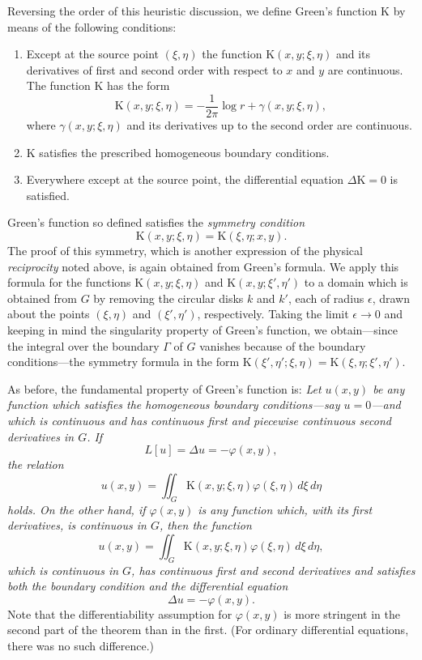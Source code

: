 Reversing the order of this heuristic discussion, we define Green's function $\mathrm K$ by means of the following conditions:
\begin{enumerate}[label=(\arabic*)]
\item Except at the source point $(\xi,\eta)$ the function $\mathrm K(x,y;\xi,\eta)$ and its derivatives of first and second order with respect to $x$ and $y$ are continuous. The function $\mathrm K$ has the form
\[
\mathrm K(x,y;\xi,\eta)=-\frac1{2\pi}\log r+\gamma(x,y;\xi,\eta),
\]
where $\gamma(x,y;\xi,\eta)$ and its derivatives up to the second order are continuous.
\item $\mathrm K$ satisfies the prescribed homogeneous boundary conditions.
\item Everywhere except at the source point, the differential equation $\Delta\mathrm K=0$ is satisfied.
\end{enumerate}
Green's function so defined satisfies the \emph{symmetry condition}
\[
\mathrm K(x,y;\xi,\eta)=\mathrm K(\xi,\eta;x,y).
\]
The proof of this symmetry, which is another expression of the physical \emph{reciprocity} noted above, is again obtained from Green's formula. We apply this formula for the functions $\mathrm K(x,y;\xi,\eta)$ and $\mathrm K(x,y;\xi',\eta')$ to a domain which is obtained from $G$ by removing the circular disks $k$ and $k'$, each of radius $\epsilon$, drawn about the points $(\xi,\eta)$ and $(\xi',\eta')$, respectively. Taking the limit $\epsilon\to0$ and keeping in mind the singularity property of Green's function, we obtain---since the integral over the boundary $\Gamma$ of $G$ vanishes because of the boundary conditions---the symmetry formula in the form $\mathrm K(\xi',\eta';\xi,\eta)=\mathrm K(\xi,\eta;\xi',\eta')$.

As before, the fundamental property of Green's function is: \emph{Let $u(x,y)$ be any function which satisfies the homogeneous boundary conditions---say $u=0$---and which is continuous and has continuous first and piecewise continuous second derivatives in $G$. If}
\[
L[u]=\Delta u=-\varphi(x,y),
\]
\emph{the relation}
\[
u(x,y)=\iint_G\mathrm K(x,y;\xi,\eta)\varphi(\xi,\eta)\,d\xi\,d\eta
\]
\emph{holds. On the other hand, if $\varphi(x,y)$ is any function which, with its first derivatives, is continuous in $G$, then the function}
\[
u(x,y)=\iint_G\mathrm K(x,y;\xi,\eta)\varphi(\xi,\eta)\,d\xi\,d\eta,
\]
\emph{which is continuous in $G$, has continuous first and second derivatives and satisfies both the boundary condition and the differential equation}
\[
\Delta u=-\varphi(x,y).
\]
Note that the differentiability assumption for $\varphi(x,y)$ is more stringent in the second part of the theorem than in the first. (For ordinary differential equations, there was no such difference.)

